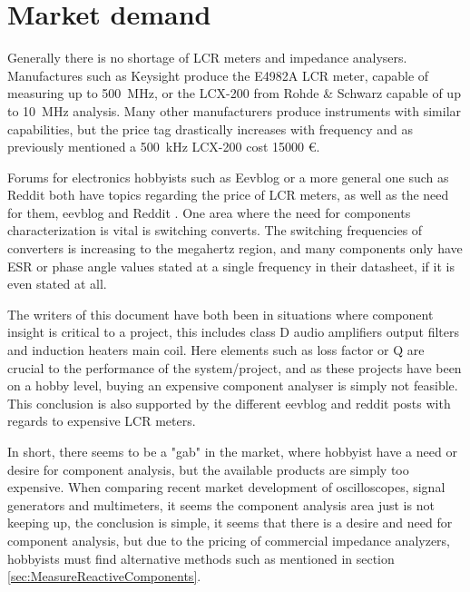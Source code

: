 \section{Market demand} \label{sec:ProfessionalMarketDemand}
Generally there is no shortage of LCR meters and impedance analysers. Manufactures such as Keysight produce the E4982A LCR meter,
 capable of measuring up to \SI{500}{\mega\hertz}, or the LCX-200 from Rohde \& Schwarz capable of up to \SI{10}{\mega\hertz}
analysis. Many other manufacturers produce instruments with similar capabilities, but the price tag drastically increases with frequency
and as previously mentioned a \SI{500}{\kilo\hertz} LCX-200 cost 15000 €. 

Forums for electronics hobbyists such as Eevblog or a more general one such as Reddit both have topics regarding the price of LCR
meters, as well as the need for them, eevblog \cite{EevblogLCR} and Reddit \cite{RedditLCR}. One area where the need for components
characterization is vital is switching converts. The switching frequencies of converters is increasing to the megahertz region, and 
many components only have ESR or phase angle values stated at a single frequency in their datasheet, if it is even stated at all.

The writers of this document have both been in situations where component insight is critical to a project, this includes class D
audio amplifiers output filters and induction heaters main coil. Here elements such as loss factor or Q are crucial to the performance
of the system/project, and as these projects have been on a hobby level, buying an expensive component analyser is simply not feasible.
This conclusion is also supported by the different eevblog and reddit posts with regards to expensive LCR meters.

In short, there seems to be a "gab" in the market, where hobbyist have a need or desire for component analysis, but the available
products are simply too expensive. When comparing recent market development of oscilloscopes, signal generators and multimeters,
it seems the component analysis area just is not keeping up, the conclusion is simple, it seems that there is a desire and need for component analysis, but due to the pricing of commercial 
impedance analyzers, hobbyists must find alternative methods such as mentioned in section \ref*{sec:MeasureReactiveComponents}.